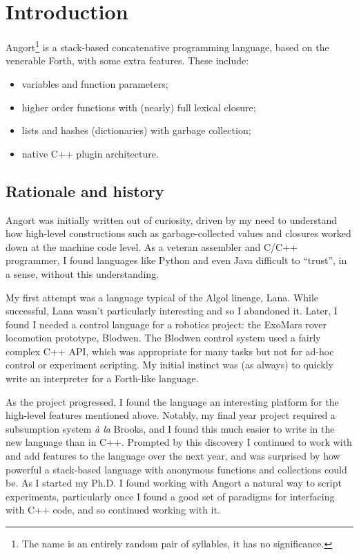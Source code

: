 \section{Introduction}
Angort\footnote{The name is an entirely random pair of syllables,
it has no significance.}
is a stack-based concatenative programming language, based on the
venerable Forth, with some
extra features. These include:
\begin{itemize}
\item variables and function parameters;
\item higher order functions with (nearly) full lexical closure;
\item lists and hashes (dictionaries) with garbage collection;
\item native C++ plugin architecture.
\end{itemize}
\subsection{Rationale and history}
Angort was initially written out of curiosity, driven by
my need to understand how high-level constructions 
such as garbage-collected values and closures worked down at the 
machine code level. As a veteran assembler and C/C++ programmer,
I found languages like Python and even Java difficult to ``trust'', in
a sense, without this understanding.

My first attempt was a language typical of the Algol lineage, Lana.
While successful, Lana wasn't particularly interesting and so I abandoned
it. Later, I found I needed a control language for a robotics project:
the ExoMars rover locomotion prototype, Blodwen. The Blodwen control
system used a fairly complex C++ API, which was appropriate for 
many tasks but not for ad-hoc control or experiment scripting.
My initial instinct was (as always)
to quickly write an interpreter for a Forth-like language.

As the project progressed, I found the language an interesting platform
for the high-level features mentioned above. Notably, my final year
project required a subsumption system \emph{\`{a} la} Brooks, and I found
this much easier to write in the new language than in C++. Prompted by
this discovery I continued to work with and add features to the language
over the next year, and was surprised by how powerful a stack-based
language with anonymous functions and collections could be.
As I started my Ph.D. I found working with Angort
a natural way to script experiments, particularly once I found
a good set of paradigms for interfacing with C++ code,
and so continued working with it.

